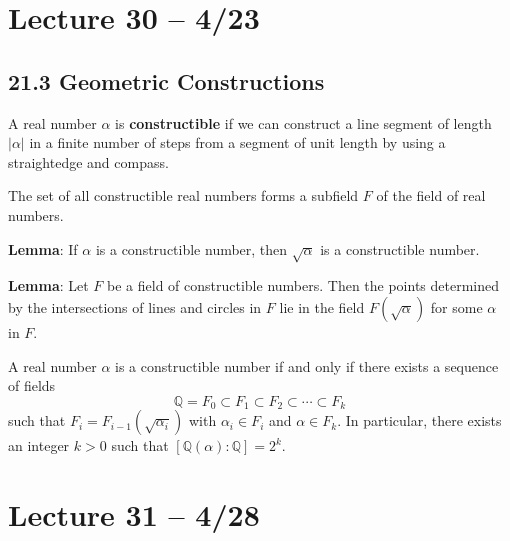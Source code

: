 \documentclass{article}
\newcommand{\Q}{\mathbb{Q}}
\begin{document}
\section{Lecture 30 -- 4/23}
\subsection{21.3 Geometric Constructions}
A real number $\alpha$ is \textbf{constructible} if we can construct a line segment of length $|\alpha|$ in a finite number of steps from a segment of unit length by using a straightedge and compass.

\begin{theorem}
  The set of all constructible real numbers forms a subfield $F$ of the field of real numbers.
\end{theorem}

\textbf{Lemma}: If $\alpha$ is a constructible number, then $\sqrt{\alpha}$ is a constructible number.

\textbf{Lemma}: Let $F$ be a field of constructible numbers. Then the points determined by the intersections of lines and circles in $F$ lie in the field $F(\sqrt{\alpha})$ for some $\alpha$ in $F$.

\begin{theorem}
  A real number $\alpha$ is a constructible number if and only if there exists a sequence of fields \[\Q=F_0\subset F_1\subset F_2\subset\cdots\subset F_k\] such that $F_i=F_{i-1}(\sqrt{\alpha_i})$ with $\alpha_i\in F_i$ and $\alpha\in F_k$. In particular, there exists an integer $k>0$ such that $[\Q(\alpha):\Q]=2^k$.
\end{theorem}

\section{Lecture 31 -- 4/28}
\end{document}
